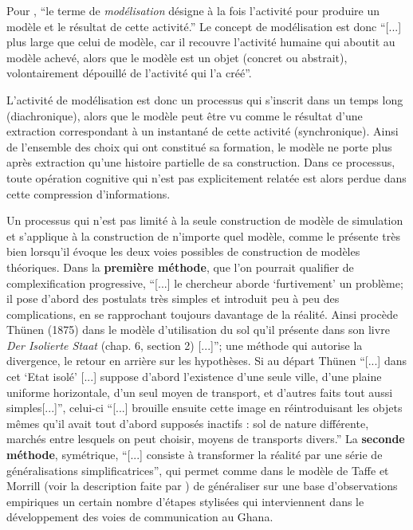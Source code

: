 Pour \textcite[36]{Langlois2005}, \enquote{le terme de \textit{modélisation} désigne à la fois l'activité pour produire un modèle et le résultat de cette activité.} Le concept de modélisation est donc \enquote{[...] plus large que celui de modèle, car il recouvre l'activité humaine qui aboutit au modèle achevé, alors que le modèle est un objet (concret ou abstrait), volontairement dépouillé de l'activité qui l'a créé}.


L'activité de modélisation est donc un processus qui s'inscrit dans un temps long (diachronique), alors que le modèle peut être vu comme le résultat d'une extraction correspondant à un instantané de cette activité (synchronique). Ainsi de l'ensemble des choix qui ont constitué sa formation, le modèle ne porte plus après extraction qu'une histoire partielle de sa construction. Dans ce processus, toute opération cognitive qui n'est pas explicitement relatée est alors perdue dans cette compression d'informations.


Un processus qui n'est pas limité à la seule construction de modèle de simulation et s'applique à la construction de n'importe quel modèle, comme le présente très bien \textcite[32-33]{Haggett1965} lorsqu'il évoque les deux voies possibles de construction de modèles théoriques. Dans la \textbf{première méthode}, que l'on pourrait qualifier de complexification progressive, \enquote{[...] le chercheur aborde \enquote{furtivement} un problème; il pose d'abord des postulats très simples et introduit peu à peu des complications, en se rapprochant toujours davantage de la réalité. Ainsi procède Thünen (1875) dans le modèle d'utilisation du sol qu'il présente dans son livre \textit{Der Isolierte Staat} (chap. 6, section 2) [...]}; une méthode qui autorise la divergence, le retour en arrière sur les hypothèses. Si au départ Thünen \enquote{[...] dans cet \enquote{Etat isolé} [...] suppose d'abord l'existence d'une seule ville, d'une plaine uniforme horizontale, d'un seul moyen de transport, et d'autres faits tout aussi simples[...]}, celui-ci \enquote{[...] brouille ensuite cette image en réintroduisant les objets mêmes qu'il avait tout d'abord supposés inactifs : sol de nature différente, marchés entre lesquels on peut choisir, moyens de transports divers.} La \textbf{seconde méthode}, symétrique, \enquote{[...] consiste à transformer la réalité par une série de généralisations simplificatrices}, qui permet comme dans le modèle de Taffe et Morrill (voir la description faite par \textcite[93-96]{Haggett1965}) de généraliser sur une base d'observations empiriques un certain nombre d'étapes stylisées qui interviennent dans le développement des voies de communication au Ghana.

